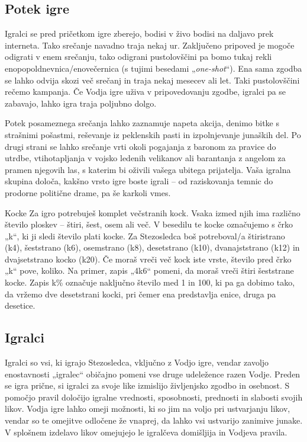 \subsection{Potek igre}

Igralci se pred pričetkom igre zberejo, bodisi v živo bodisi na daljavo prek interneta. Tako srečanje navadno traja nekaj ur. Zaključeno pripoved je mogoče odigrati v enem srečanju, tako odigrani pustolovščini pa bomo tukaj rekli enopopoldnevnica/enovečernica (s tujimi besedami „\textit{one-shot}“). Ena sama zgodba se lahko odvija skozi več srečanj in traja nekaj mesecev ali let. Taki pustolovščini rečemo kampanja. Če Vodja igre uživa v pripovedovanju zgodbe, igralci pa se zabavajo, lahko igra traja poljubno dolgo.

Potek posameznega srečanja lahko zaznamuje napeta akcija, denimo bitke s strašnimi pošastmi, reševanje iz peklenskih pasti in izpolnjevanje junaških del. Po drugi strani se lahko srečanje vrti okoli pogajanja z baronom za pravice do utrdbe, vtihotapljanja v vojsko ledenih velikanov ali barantanja z angelom za pramen njegovih las, s katerim bi oživili vašega ubitega prijatelja. Vaša igralna skupina določa, kakšno vrsto igre boste igrali -- od raziskovanja temnic do prodorne politične drame, pa še karkoli vmes.

\begin{rpg-titlebox}{Kocke}
    \label{sidenote-kocke}
    Za igro potrebuješ komplet večstranih kock. Vsaka izmed njih ima različno število ploskev -- štiri, šest, osem ali več. V besedilu te kocke označujemo s črko „k“, ki ji sledi število plati kocke. Za Stezosledca boš potreboval/a štiristrano (k4), šeststrano (k6), osemstrano (k8), desetstrano (k10), dvanajststrano (k12) in dvajsetstrano kocko (k20). Če moraš vreči več kock iste vrste, število pred črko „k“ pove, koliko. Na primer, zapis „4k6“ pomeni, da moraš vreči štiri šeststrane kocke. Zapis k\% označuje naključno število med 1 in 100, ki pa ga dobimo tako, da vržemo dve desetstrani kocki, pri čemer ena predstavlja enice, druga pa desetice.
\end{rpg-titlebox}

\subsection{Igralci}

Igralci so vsi, ki igrajo Stezosledca, vključno z Vodjo igre, vendar zavoljo enostavnosti „igralec“ običajno pomeni vse druge udeležence razen Vodje. Preden se igra prične, si igralci za svoje like izmislijo življenjsko zgodbo in osebnost. S pomočjo pravil določijo igralne vrednosti, sposobnosti, prednosti in slabosti svojih likov. Vodja igre lahko omeji možnosti, ki so jim na voljo pri ustvarjanju likov, vendar so te omejitve odločene že vnaprej, da lahko vsi ustvarijo zanimive junake. V splošnem izdelavo likov omejujejo le igralčeva domišljija in Vodjeva pravila.

